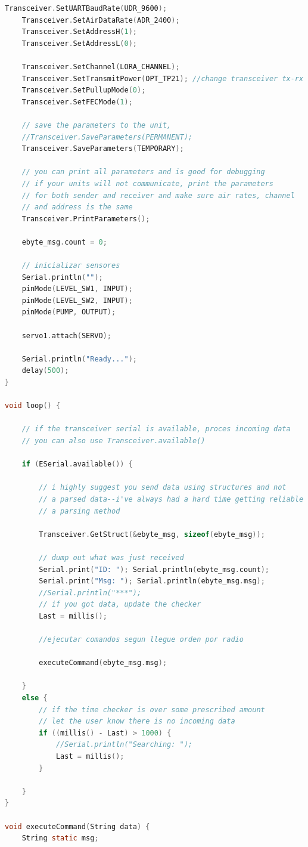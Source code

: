 \documentclass[12pt]{article}
\begin{document}
\begin{lstlisting}[language=C]
	Transceiver.SetUARTBaudRate(UDR_9600);
	Transceiver.SetAirDataRate(ADR_2400);
	Transceiver.SetAddressH(1);
	Transceiver.SetAddressL(0);
	
	Transceiver.SetChannel(LORA_CHANNEL);
	Transceiver.SetTransmitPower(OPT_TP21); //change transceiver tx-rx power 
	Transceiver.SetPullupMode(0);
	Transceiver.SetFECMode(1);  
	
	// save the parameters to the unit,
	//Transceiver.SaveParameters(PERMANENT);
	Transceiver.SaveParameters(TEMPORARY);
	
	// you can print all parameters and is good for debugging
	// if your units will not communicate, print the parameters
	// for both sender and receiver and make sure air rates, channel
	// and address is the same
	Transceiver.PrintParameters();
	
	ebyte_msg.count = 0;
	
	// inicializar sensores
	Serial.println("");
	pinMode(LEVEL_SW1, INPUT);
	pinMode(LEVEL_SW2, INPUT);
	pinMode(PUMP, OUTPUT);
	
	servo1.attach(SERVO);
	
	Serial.println("Ready...");
	delay(500);
}

void loop() {
	
	// if the transceiver serial is available, proces incoming data
	// you can also use Transceiver.available()
	
	if (ESerial.available()) {
		
		// i highly suggest you send data using structures and not
		// a parsed data--i've always had a hard time getting reliable data using
		// a parsing method
		
		Transceiver.GetStruct(&ebyte_msg, sizeof(ebyte_msg));
		
		// dump out what was just received
		Serial.print("ID: "); Serial.println(ebyte_msg.count);
		Serial.print("Msg: "); Serial.println(ebyte_msg.msg);
		//Serial.println("***");
		// if you got data, update the checker
		Last = millis();
		
		//ejecutar comandos segun llegue orden por radio
		
		executeCommand(ebyte_msg.msg);
		
	}
	else {
		// if the time checker is over some prescribed amount
		// let the user know there is no incoming data
		if ((millis() - Last) > 1000) {
			//Serial.println("Searching: ");
			Last = millis();
		}
		
	}
}

void executeCommand(String data) {
	String static msg;
	

\end{lstlisting}
\end{document}
